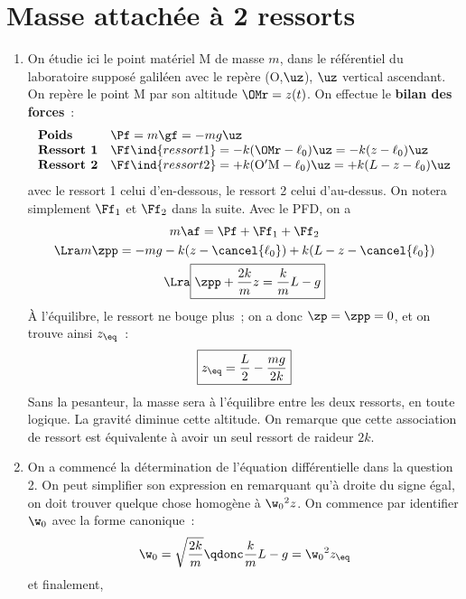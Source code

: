 \documentclass[a4paper, 12pt, final, garamond]{book}
\begin{document}
\section{Masse attachée à 2 ressorts}
\begin{enumerate}
    \item On étudie ici le point matériel M de masse $m$, dans le référentiel du
        laboratoire supposé galiléen avec le repère (O,$\uz$), $\uz$ vertical
        ascendant. On repère le point M par son altitude $\OMr = z(t)$.
        On effectue le \textbf{bilan des forces}~:
        \[
            \begin{array}{ll}
                \textbf{Poids} & \Pf = m\gf = -mg\uz\\
                \textbf{Ressort 1} & \Ff\ind{ressort 1}
                    = -k(\OMr - \ell_0)\uz = -k(z-\ell_0)\uz\\
                \textbf{Ressort 2} & \Ff\ind{ressort 2}
                    = +k({\rm O'M} - \ell_0)\uz = +k(L-z-\ell_0)\uz
            \end{array}
        \]
        avec le ressort 1 celui d'en-dessous, le ressort 2 celui d'au-dessus. On
        notera simplement $\Ff_1$ et $\Ff_2$ dans la suite.
        Avec le PFD, on a
        \begin{gather*}
            m\af = \Pf + \Ff_1 + \Ff_2\\
            \Lra
            m\zpp = -mg -k(z - \cancel{\ell_0}) + k(L - z -\cancel{\ell_0})\\
            \Lra
            \boxed{\zpp + \frac{2k}{m}z = \frac{k}{m}L -g}
        \end{gather*}
        À l'équilibre, le ressort ne bouge plus~; on a donc $\zp = \zpp = 0$, et
        on trouve ainsi $z_{\eq}$~:
        \[\boxed{z_{\eq} = \frac{L}{2} - \frac{mg}{2k}}\]
        Sans la pesanteur, la masse sera à l'équilibre entre les deux ressorts,
        en toute logique. La gravité diminue cette altitude. On remarque que
        cette association de ressort est équivalente à avoir un seul ressort de
        raideur $2k$.
    \item On a commencé la détermination de l'équation différentielle dans la
        question 2. On peut simplifier son expression en remarquant qu'à droite
        du signe égal, on doit trouver quelque chose homogène à $\w_0{}^2z$. On
        commence par identifier $\w_0$ avec la forme canonique~:
        \[\w_0 = \sqrt{\frac{2k}{m}}
            \qdonc
            \frac{k}{m}L - g = \w_0{}^2z_{\eq}
        \]
        et finalement,

\end{enumerate}
\end{document}
